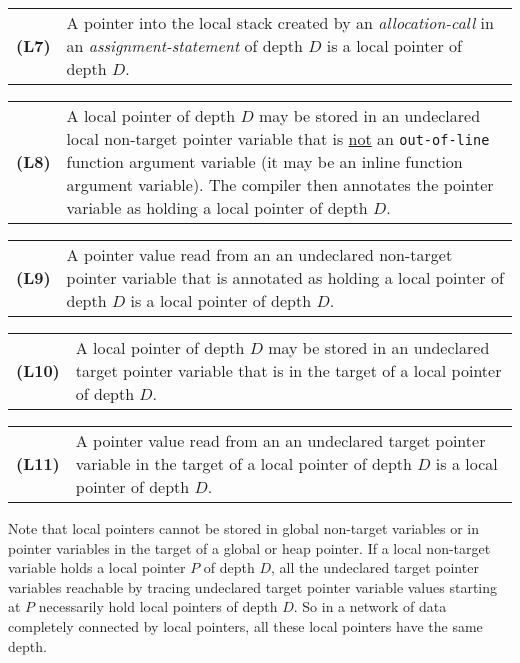 \documentclass[12pt]{article}
\newcommand{\key}[1]{{\rm \bfseries #1}}
\newenvironment{indpar}[1][0.3in]%
	{\begin{list}{}%
		     {\setlength{\itemsep}{0in}%
		      \setlength{\topsep}{0in}%
		      \setlength{\parsep}{1ex}%
		      \setlength{\labelwidth}{#1}%
		      \setlength{\leftmargin}{#1}%
		      \addtolength{\leftmargin}{\labelsep}}%
	 \item}%
	{\end{list}}
\begin{document}
\begin{indpar}[0.2in]

\begin{tabular}{p{0.5in}p{5.0in}}
\key{(L7)}	& A pointer into the local stack
		  created by an {\em allocation-call}
		  in an {\em assignment-statement} of depth $D$
		  is a local pointer of depth $D$.
\end{tabular}

\begin{tabular}{p{0.5in}p{5.0in}}
\key{(L8)}	& A local pointer of depth $D$ may be stored in
		  an undeclared local non-target pointer variable
		  that is \underline{not} an {\tt out-of-line}
		  function argument variable (it may be an inline
		  function argument variable).  The compiler
		  then annotates the pointer variable as holding a local
		  pointer of depth $D$.
\end{tabular}

\begin{tabular}{p{0.5in}p{5.0in}}
\key{(L9)}	& A pointer value read from an
		  an undeclared non-target pointer variable
		  that is annotated as holding a local pointer of depth $D$
		  is a local pointer of depth $D$.
\end{tabular}

\begin{tabular}{p{0.5in}p{5.0in}}
\key{(L10)}	& A local pointer of depth $D$ may be stored in
		  an undeclared target pointer variable
		  that is in the target of a
		  local pointer of depth $D$.
\end{tabular}

\begin{tabular}{p{0.5in}p{5.0in}}
\key{(L11)}	& A pointer value read from an
		  an undeclared target pointer variable
		  in the target of a local pointer of depth $D$
		  is a local pointer of depth $D$.
\end{tabular}

\end{indpar}

Note that local pointers cannot be stored in global non-target variables
or in pointer variables in the target of a global or heap pointer.
If a local non-target variable holds a local pointer $P$ of depth $D$,
all the undeclared target pointer variables reachable by tracing
undeclared target pointer variable values starting at $P$ necessarily hold
local pointers of depth $D$.  So in a network of
data completely connected by local pointers, all these local pointers
have the same depth.
\end{document}
